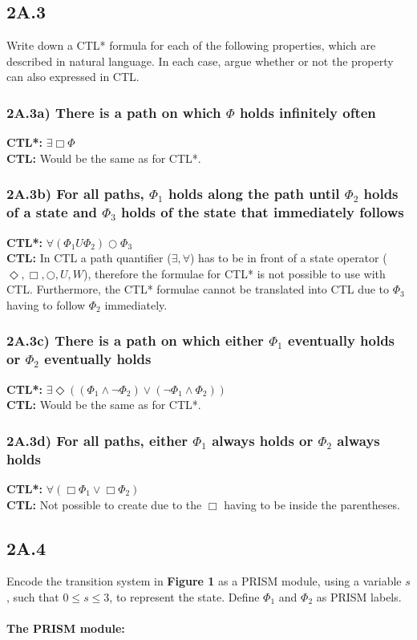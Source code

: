\documentclass[12pt]{report}
\begin{document}
\subsection*{2A.3}
Write down a CTL* formula for each of the following properties, which are described in natural language. In each case, argue whether or not the property can also expressed in CTL.

\subsubsection*{2A.3a) There is a path on which $\Phi$ holds infinitely often}
	\textbf{CTL*:} $\exists \Box \Phi$\\
	\textbf{CTL:} Would be the same as for CTL*.

\subsubsection*{2A.3b) For all paths, $\Phi_1$ holds along the path until $\Phi_2$ holds of a state and $\Phi_3$ holds of the state that immediately follows}
	\textbf{CTL*:} $\forall (\Phi_1 U \Phi_2) \bigcirc \Phi_3$\\
	\textbf{CTL:} In CTL a path quantifier ($\exists, \forall$) has to be in front of a state operator ($\Diamond, \Box, \bigcirc, U, W$), therefore the formulae for CTL* is not possible to use with CTL. Furthermore, the CTL* formulae cannot be translated into CTL due to $\Phi_3$ having to follow $\Phi_2$ immediately. 

\subsubsection*{2A.3c) There is a path on which either $\Phi_1$ eventually holds or $\Phi_2$ eventually holds}
	\textbf{CTL*:} $\exists \Diamond \left((\Phi_1 \wedge \neg\Phi_2) \vee (\neg\Phi_1 \wedge \Phi_2)\right)$\\
	\textbf{CTL:} Would be the same as for CTL*.

\subsubsection*{2A.3d) For all paths, either $\Phi_1$ always holds or $\Phi_2$ always holds}
	\textbf{CTL*:} $\forall(\Box \Phi_1 \vee \Box \Phi_2)$\\
	\textbf{CTL:} Not possible to create due to the $\Box$ having to be inside the parentheses.

\newpage
\subsection*{2A.4}
Encode the transition system in \textbf{Figure 1} as a PRISM module, using a variable $s$, such that $0 \leq s \leq 3$, to represent the state. Define $\Phi_1$ and $\Phi_2$ as PRISM labels.\\
\\
\textbf{The PRISM module:}

\end{document}
